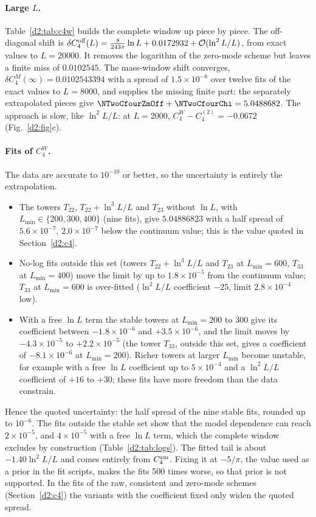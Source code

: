 \paragraph{Large $L$.} Table~\ref{d2:tab:c4w} builds the complete window up piece by piece. The off-diagonal shift is
$\delta C_4^{\rm off}(L)=\frac8{243\pi}\ln L+0.0172932+\mathcal O(\ln^2L/L)$, from exact values to $L=20000$. It removes the
logarithm of the zero-mode scheme but leaves a finite miss of $0.0102545$. The mass-window shift converges,
$\delta C_4^M(\infty)=0.0102543394$ with a spread of $1.5\times10^{-8}$ over twelve fits of the exact values to $L=8000$, and
supplies the missing finite part: the separately extrapolated pieces give $\NTwoCfourZmOff+\NTwoCfourChi=5.0488682$. The
approach is slow, like $\ln^2L/L$: at $L=2000$, $C_4^W-C_4^{(2)}=-0.0672$ (Fig.~\ref{d2:fig}c).

\paragraph{Fits of $C_4^W$.} The data are accurate to $10^{-10}$ or better, so the uncertainty is entirely the extrapolation.
\begin{itemize}
\item The towers $T_{22}$, $T_{22}+\ln^3L/L$ and $T_{23}$ without $\ln L$, with $L_{\min}\in\{200,300,400\}$ (nine fits), give
 $5.04886823$ with a half spread of $5.6\times10^{-7}$, $2.0\times10^{-7}$ below the continuum value; this is the value
 quoted in Section~\ref{d2:c4}.
\item No-log fits outside this set (towers $T_{22}+\ln^3L/L$ and $T_{23}$ at $L_{\min}=600$, $T_{33}$ at $L_{\min}=400$) move
 the limit by up to $1.8\times10^{-5}$ from the continuum value; $T_{33}$ at $L_{\min}=600$ is over-fitted ($\ln^2L/L$
 coefficient $-25$, limit $2.8\times10^{-4}$ low).
\item With a free $\ln L$ term the stable towers at $L_{\min}=200$ to 300 give its coefficient between $-1.8\times10^{-6}$ and
 $+3.5\times10^{-6}$, and the limit moves by $-4.3\times10^{-5}$ to $+2.2\times10^{-5}$ (the tower $T_{33}$,
 outside this set, gives a coefficient of $-8.1\times10^{-6}$ at $L_{\min}=200$). Richer towers at larger $L_{\min}$ become unstable, for example with a free $\ln L$ coefficient up to
 $5\times10^{-4}$ and a $\ln^2L/L$ coefficient of $+16$ to $+30$; these fits have more freedom than the data constrain.
\end{itemize}
Hence the quoted uncertainty: the half spread of the nine stable fits, rounded up to $10^{-6}$. The fits outside the stable
set show that the model dependence can reach $2\times10^{-5}$, and $4\times10^{-5}$ with a free $\ln L$ term, which the
complete window excludes by construction (Table~\ref{d2:tab:logs}). The fitted tail is about $-1.40\ln^2L/L$ and comes entirely from $C_4^{\rm zm}$.
Fixing it at $-5/\pi$, the value used as a prior in the fit scripts, makes the fits 500 times worse, so that prior is not
supported. In the
fits of the raw, consistent and zero-mode schemes (Section~\ref{d2:c4}) the variants with the coefficient fixed only widen the quoted spread.
